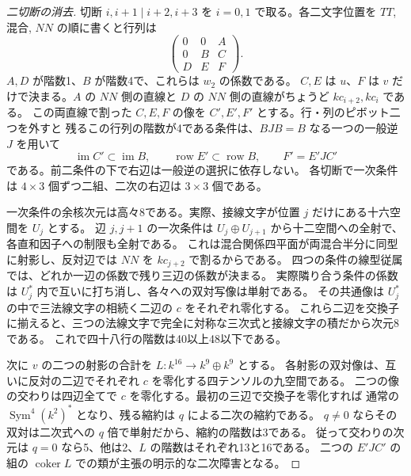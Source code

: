 \begin{proof}[二切断の消去]
切断 $i,i+1\mid i+2,i+3$ を $i=0,1$ で取る。各二文字位置を $TT$, 混合, $NN$ の順に書くと行列は
\[
 \begin{pmatrix}0&0&A\\0&B&C\\D&E&F\end{pmatrix}.
\]
$A,D$ が階数1、$B$ が階数4で、これらは $w_2$ の係数である。
$C,E$ は $u$、$F$ は $v$ だけで決まる。$A$ の $NN$ 側の直線と
$D$ の $NN$ 側の直線がちょうど $k c_{i+2},k c_i$ である。
この両直線で割った $C,E,F$ の像を $C',E',F'$ とする。行・列のピボット二つを外すと
残るこの行列の階数が4である条件は、$BJB=B$ なる一つの一般逆 $J$ を用いて
\[
 \operatorname{im} C'\subset\operatorname{im} B,\qquad
 \operatorname{row} E'\subset\operatorname{row} B,\qquad F'=E'JC'
\]
である。前二条件の下で右辺は一般逆の選択に依存しない。
各切断で一次条件は $4\times3$ 個ずつ二組、二次の右辺は $3\times3$ 個である。

一次条件の余核次元は高々8である。実際、接線文字が位置 $j$ だけにある十六空間を $U_j$ とする。
辺 $j,j+1$ の一次条件は $U_j\oplus U_{j+1}$ から十二空間への全射で、各直和因子への制限も全射である。
これは混合関係四平面が両混合半分に同型に射影し、反対辺では $NN$ を $kc_{j+2}$ で割るからである。
四つの条件の線型従属では、どれか一辺の係数で残り三辺の係数が決まる。
実際隣り合う条件の係数は $U_j^*$ 内で互いに打ち消し、各々への双対写像は単射である。
その共通像は $U_j^*$ の中で三法線文字の相続く二辺の $c$ をそれぞれ零化する。
これら二辺を交換子に揃えると、三つの法線文字で完全に対称な三次式と接線文字の積だから次元8である。
これで四十八行の階数は40以上48以下である。

次に $v$ の二つの射影の合計を $L:k^{16}\to k^9\oplus k^9$ とする。
各射影の双対像は、互いに反対の二辺でそれぞれ $c$ を零化する四テンソルの九空間である。
二つの像の交わりは四辺全てで $c$ を零化する。最初の三辺で交換子を零化すれば
通常の $\operatorname{Sym}^4(k^2)^*$ となり、残る縮約は $q$ による二次の縮約である。
$q\ne0$ ならその双対は二次式への $q$ 倍で単射だから、縮約の階数は3である。
従って交わりの次元は $q=0$ なら5、他は2、$L$ の階数はそれぞれ13と16である。
二つの $E'JC'$ の組の $\operatorname{coker}L$ での類が主張の明示的な二次障害となる。
\end{proof}
